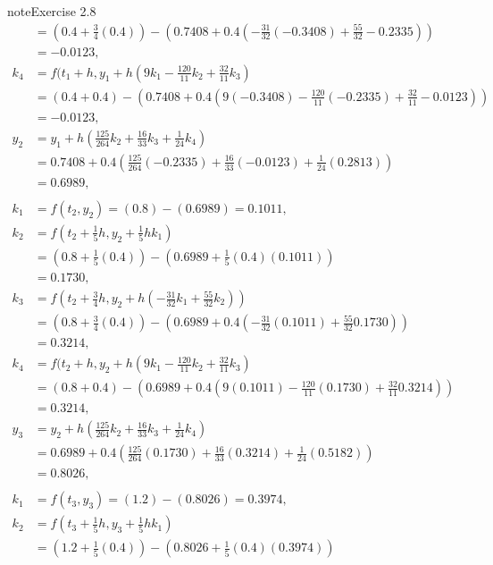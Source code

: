 \documentclass[letterpaper,10pt,english]{jupyterBook}
\begin{document}
\begin{sphinxadmonition}{note}{Exercise 2.8}
\begin{align*}
    &= (0.4 + \tfrac{3}{4}(0.4)) - (0.7408 + 0.4(-\tfrac{31}{32}(-0.3408) + \tfrac{55}{32}-0.2335)) \\
    &= -0.0123, \\
    k_4 &= f(t_1 + h, y_1 + h(9k_1 - \tfrac{120}{11}k_2 + \tfrac{32}{11}k_3) \\
    &= (0.4 + 0.4) - (0.7408 + 0.4(9(-0.3408) - \tfrac{120}{11}(-0.2335) + \tfrac{32}{11}-0.0123)) \\
    &= -0.0123, \\
    y_2 &= y_1 + h\left( \tfrac{125}{264} k_2 + \tfrac{16}{33} k_3 + \tfrac{1}{24} k_4 \right) \\
    &= 0.7408 + 0.4 \left( \tfrac{125}{264} (-0.2335) + \tfrac{16}{33} (-0.0123) + \tfrac{1}{24} (0.2813) \right) \\
    &= 0.6989, \\
    \\
    k_1 &= f(t_2, y_2) = (0.8) - (0.6989) = 0.1011, \\
    k_2 &= f(t_2 + \tfrac{1}{5}h, y_2 + \tfrac{1}{5}hk_1) \\
    &= (0.8 + \tfrac{1}{5}(0.4)) - (0.6989 + \tfrac{1}{5}(0.4)(0.1011)) \\
    &= 0.1730, \\
    k_3 &= f(t_2 + \tfrac{3}{4}h, y_2 + h(-\tfrac{31}{32}k_1 + \tfrac{55}{32}k_2)) \\
    &= (0.8 + \tfrac{3}{4}(0.4)) - (0.6989 + 0.4(-\tfrac{31}{32}(0.1011) + \tfrac{55}{32}0.1730)) \\
    &= 0.3214, \\
    k_4 &= f(t_2 + h, y_2 + h(9k_1 - \tfrac{120}{11}k_2 + \tfrac{32}{11}k_3) \\
    &= (0.8 + 0.4) - (0.6989 + 0.4(9(0.1011) - \tfrac{120}{11}(0.1730) + \tfrac{32}{11}0.3214)) \\
    &= 0.3214, \\
    y_3 &= y_2 + h\left( \tfrac{125}{264} k_2 + \tfrac{16}{33} k_3 + \tfrac{1}{24} k_4 \right) \\
    &= 0.6989 + 0.4 \left( \tfrac{125}{264} (0.1730) + \tfrac{16}{33} (0.3214) + \tfrac{1}{24} (0.5182) \right) \\
    &= 0.8026, \\
    \\
    k_1 &= f(t_3, y_3) = (1.2) - (0.8026) = 0.3974, \\
    k_2 &= f(t_3 + \tfrac{1}{5}h, y_3 + \tfrac{1}{5}hk_1) \\
    &= (1.2 + \tfrac{1}{5}(0.4)) - (0.8026 + \tfrac{1}{5}(0.4)(0.3974)) \\

\end{align*}
\end{sphinxadmonition}
\end{document}
